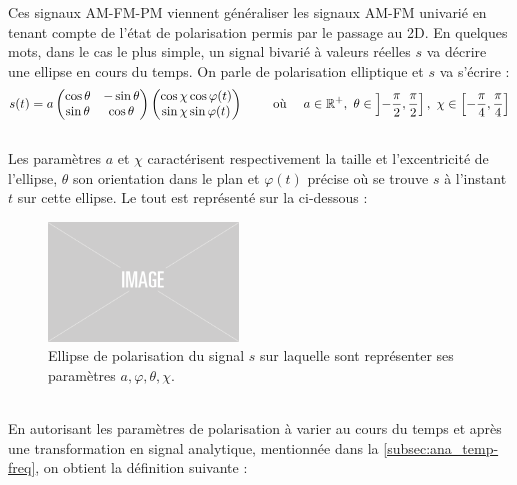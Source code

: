 Ces signaux AM-FM-PM viennent généraliser les signaux AM-FM univarié en tenant compte de l'état de polarisation permis par le passage au 2D. 
En quelques mots, dans le cas le plus simple, un signal bivarié à valeurs réelles $s$ va décrire une ellipse en cours du temps. 
On parle de polarisation elliptique et $s$ va s'écrire :
\[s(t) = a \begin{pmatrix} \cos\theta & -\sin\theta \\ \sin\theta  &  \cos\theta \end{pmatrix} \begin{pmatrix} \cos\chi \cos\varphi(t) \\ \sin\chi \sin\varphi(t) \end{pmatrix}  \qquad \text{ où }\quad  a\in\mathbb{R}^+,\ \theta \in \left]-\frac{\pi}{2}, \frac{\pi}{2}\right],\ \chi \in \left[-\frac{\pi}{4}, \frac{\pi}{4}\right] \]
\\
Les paramètres $a$ et $\chi$ caractérisent respectivement la taille et l'excentricité de l'ellipse, $\theta$ son orientation dans le plan et $\varphi(t)$ précise où se trouve $s$ à l'instant $t$ sur cette ellipse. 
Le tout est représenté sur la  ci-dessous :
\begin{figure}[h]
	\includegraphics[width=0.45\textwidth]{fig/placeholder}
	\caption[Ellipse de polarisation d'un signal bivarié réel]{Ellipse de polarisation du signal $s$ sur laquelle sont représenter ses paramètres $a,\varphi,\theta,\chi$.}
	\label{fig:ellipse2polat}
\end{figure}
\\
En autorisant les paramètres de polarisation à varier au cours du temps et après une transformation en signal analytique, mentionnée dans la \cref{subsec:ana_temp-freq}, on obtient la définition suivante :
\\
